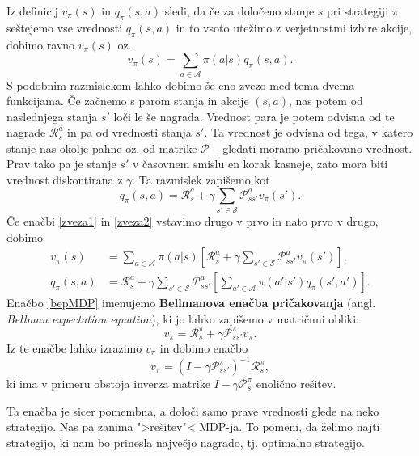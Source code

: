 \documentclass[12pt,a4paper]{amsart}
\theoremstyle{definition} %
\theoremstyle{plain} %
\begin{document}
Iz definicij $v_\pi(s)$ in $q_\pi(s, a)$ sledi, da če za določeno stanje $s$ pri strategiji $\pi$ 
seštejemo vse vrednosti $q_\pi(s, a)$ in to vsoto utežimo z verjetnostmi izbire akcije, dobimo ravno 
$v_\pi(s)$ oz. 
\begin{equation}\label{zveza1}
    v_\pi(s) = \sum_{a \in \mathcal{A}} \pi(a|s)q_\pi(s, a).
\end{equation}
S podobnim razmislekom lahko dobimo še eno zvezo med tema dvema funkcijama. Če začnemo s parom stanja 
in akcije $(s, a)$, nas potem od naslednjega stanja $s'$ loči le še nagrada. Vrednost para je potem 
odvisna od te nagrade $\mathcal{R}_s^a$ in pa od vrednosti stanja $s'$. Ta vrednost je odvisna od tega, 
v katero stanje nas okolje pahne oz. od matrike $\mathcal{P}$ -- gledati moramo pričakovano vrednost. 
Prav tako pa je stanje $s'$ v časovnem smislu en korak kasneje, zato mora biti vrednost diskontirana z 
$\gamma$. Ta razmislek zapišemo kot
\begin{equation}\label{zveza2}
    q_\pi(s, a) = \mathcal{R}_s^a + \gamma \sum_{s' \in \mathcal{S}} \mathcal{P}_{ss'}^a v_\pi(s').
\end{equation}
Če enačbi \eqref{zveza1} in \eqref{zveza2} vstavimo drugo v prvo in nato prvo v drugo, dobimo
\begin{align}
    v_\pi(s) &= \sum_{a \in \mathcal{A}} \pi(a|s) \left[\mathcal{R}_s^a + 
    \gamma \sum_{s' \in \mathcal{S}} \mathcal{P}_{ss'}^a v_\pi(s') \right], \label{bepMDP} \\
    q_\pi(s, a) &= \mathcal{R}_s^a + \gamma \sum_{s' \in \mathcal{S}} 
    \mathcal{P}_{ss'}^a \left[\sum_{a' \in \mathcal{A}} \pi(a'|s')q_\pi(s', a') \right].
\end{align}
Enačbo \eqref{bepMDP} imenujemo \textbf{Bellmanova enačba pričakovanja} (angl. \textit{Bellman 
expectation equation}), ki jo lahko zapišemo v matričnni obliki:
$$
v_\pi = \mathcal{R}^\pi_s + \gamma \mathcal{P}^\pi_{ss'} v_\pi.
$$
Iz te enačbe lahko izrazimo $v_\pi$ in dobimo enačbo
$$
v_\pi = (I - \gamma \mathcal{P}^\pi_{ss'})^{-1} \mathcal{R}^\pi_{s},
$$
ki ima v primeru obstoja inverza matrike $I - \gamma \mathcal{P}^\pi_s$ enolično rešitev.

Ta enačba je sicer pomembna, a določi samo prave vrednosti glede na neko strategijo. Nas pa zanima 
">rešitev"< MDP-ja. To pomeni, da želimo najti strategijo, ki nam bo prinesla največjo nagrado, tj. 
optimalno strategijo.
\end{document}
